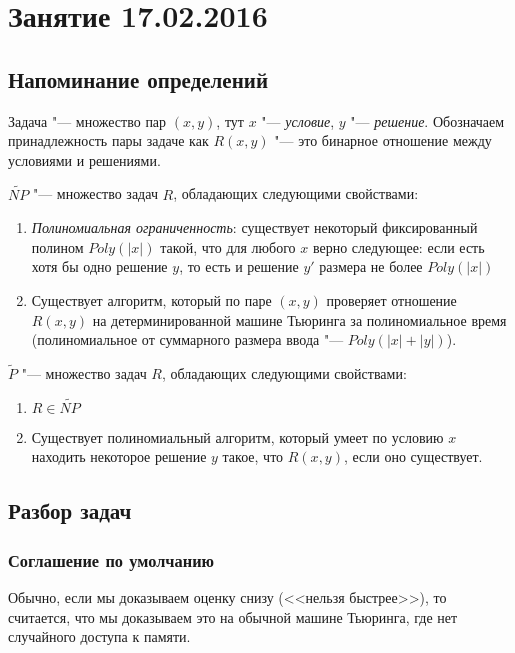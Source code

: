 \chapter{Занятие 17.02.2016}
\section{Напоминание определений}

\begin{Def}
	Задача "--- множество пар $(x, y)$, тут $x$ "--- \textit{условие}, $y$ "--- \textit{решение}.
	Обозначаем принадлежность пары задаче как $R(x, y)$ "--- это бинарное отношение между
	условиями и решениями.
\end{Def}

\begin{Def}
	$\widetilde{NP}$ "--- множество задач $R$, обладающих следующими свойствами:
	\begin{enumerate}
		\item
			\textit{Полиномиальная ограниченность}: существует некоторый фиксированный
			полином $Poly(|x|)$ такой, что для любого $x$ верно следующее:
			если есть хотя бы одно решение $y$, то есть и решение $y'$ размера не более
			$Poly(|x|)$
		\item
			Существует алгоритм, который по паре $(x, y)$ проверяет отношение $R(x, y)$
			на детерминированной машине Тьюринга за полиномиальное время (полиномиальное
			от суммарного размера ввода "--- $Poly(|x| + |y|)$).
	\end{enumerate}
\end{Def}

\begin{Def}
	$\widetilde{P}$ "--- множество задач $R$, обладающих следующими свойствами:
	\begin{enumerate}
		\item $R \in \widetilde{NP}$
		\item
			Существует полиномиальный алгоритм, который умеет по условию $x$ находить некоторое
			решение $y$ такое, что $R(x, y)$, если оно существует.
	\end{enumerate}
\end{Def}

\section{Разбор задач}
\subsection{Соглашение по умолчанию}
	Обычно, если мы доказываем оценку снизу (<<нельзя быстрее>>), то считается, что
	мы доказываем это на обычной машине Тьюринга, где нет случайного доступа к памяти.

